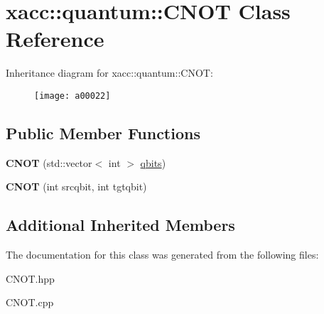 \hypertarget{a00022}{}\section{xacc\+:\+:quantum\+:\+:C\+N\+OT Class Reference}
\label{a00022}
Inheritance diagram for xacc\+:\+:quantum\+:\+:C\+N\+OT\+:\begin{figure}[H]
\begin{center}
\leavevmode
\texttt{[image: a00022]}
\end{center}
\end{figure}
\subsection*{Public Member Functions}
\begin{DoxyCompactItemize}
\item 
{\bfseries C\+N\+OT} (std\+::vector$<$ int $>$ \hyperlink{a00041_a2a56be6c2519ea65df4d06f4abae1393}{qbits})\hypertarget{a00022_ad3d460779a27affa317dd4f3a88268b3}{}\label{a00022_ad3d460779a27affa317dd4f3a88268b3}

\item 
{\bfseries C\+N\+OT} (int srcqbit, int tgtqbit)\hypertarget{a00022_a15efcb44477dde4b6151fe1776a73ddc}{}\label{a00022_a15efcb44477dde4b6151fe1776a73ddc}

\end{DoxyCompactItemize}
\subsection*{Additional Inherited Members}


The documentation for this class was generated from the following files\+:\begin{DoxyCompactItemize}
\item 
C\+N\+O\+T.\+hpp\item 
C\+N\+O\+T.\+cpp\end{DoxyCompactItemize}
